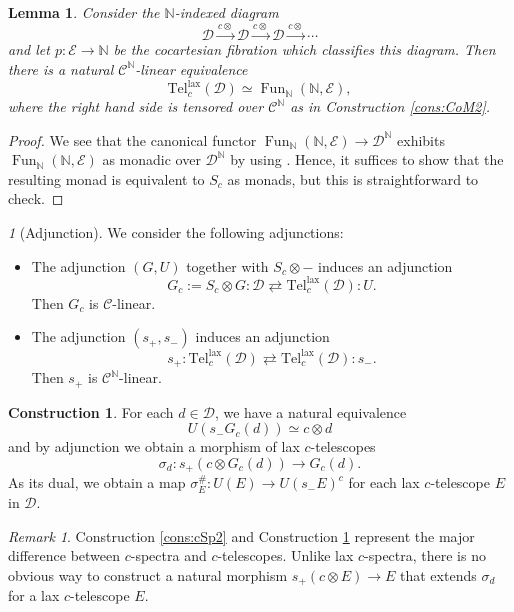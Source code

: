 \documentclass{amsart}
\theoremstyle{plain}
\newtheorem{lemma}[theorem]{Lemma}
\theoremstyle{definition}
\newtheorem{construction}[theorem]{Construction}
\theoremstyle{remark}
\newtheorem{remark}[theorem]{Remark}
\newtheorem{p}[theorem]{}
\numberwithin{equation}{theorem}
\newcommand{\mcal}[1]{\mathcal{#1}}
\newcommand{\mbb}[1]{\mathbb{#1}}
\newcommand{\Tel}{\mathrm{Tel}}
\newcommand{\lax}{\mathrm{lax}}
\newcommand{\Fun}{\operatorname{Fun}}
\begin{document}
\begin{lemma}\label{lem:cTe}
Consider the $\mbb{N}$-indexed diagram
\[
	\mcal{D} \xrightarrow{c\otimes} \mcal{D} \xrightarrow{c\otimes} \mcal{D} \xrightarrow{c\otimes} \cdots 
\]
and let $p\colon\mcal{E}\to\mbb{N}$ be the cocartesian fibration which classifies this diagram.
Then there is a natural $\mcal{C}^\mbb{N}$-linear equivalence
\[
	\Tel^\lax_c(\mcal{D}) \simeq \Fun_{\mbb{N}}(\mbb{N},\mcal{E}),
\]
where the right hand side is tensored over $\mcal{C}^\mbb{N}$ as in Construction \ref{cons:CoM2}.
\end{lemma}
\begin{proof}
We see that the canonical functor $\Fun_{\mbb{N}}(\mbb{N},\mcal{E})\to\mcal{D}^\mbb{N}$ exhibits $\Fun_{\mbb{N}}(\mbb{N},\mcal{E})$ as monadic over $\mcal{D}^\mbb{N}$ by using \cite[4.7.3.5]{HA}.
Hence, it suffices to show that the resulting monad is equivalent to $S_c$ as monads, but this is straightforward to check.
\end{proof}

\begin{p}[Adjunction]\label{p:cTe}
We consider the following adjunctions:
\begin{itemize}[label={---},leftmargin=*]
\item The adjunction $(G,U)$ together with $S_c\otimes-$ induces an adjunction
\[
	G_c:=S_c\otimes G \colon \mcal{D} \rightleftarrows \Tel^\lax_c(\mcal{D}) \colon U.
\]
Then $G_c$ is $\mcal{C}$-linear.
\item The adjunction $(s_+,s_-)$ induces an adjunction 
\[
	s_+ \colon \Tel^\lax_c(\mcal{D}) \rightleftarrows \Tel^\lax_c(\mcal{D}) \colon s_-.
\]
Then $s_+$ is $\mcal{C}^\mbb{N}$-linear.
\end{itemize}
\end{p}

\begin{construction}\label{cons:cTe2}
For each $d\in\mcal{D}$, we have a natural equivalence
\[
	U(s_-G_c(d)) \simeq c\otimes d
\]
and by adjunction we obtain a morphism of lax $c$-telescopes
\[
	\sigma_d\colon s_+(c\otimes G_c(d))\to G_c(d).
\]
As its dual, we obtain a map $\sigma^\#_E\colon U(E)\to U(s_-E)^c$ for each lax $c$-telescope $E$ in $\mcal{D}$.
\end{construction}

\begin{remark}
Construction \ref{cons:cSp2} and Construction \ref{cons:cTe2} represent the major difference between $c$-spectra and $c$-telescopes.
Unlike lax $c$-spectra, there is no obvious way to construct a natural morphism $s_+(c\otimes E)\to E$ that extends $\sigma_d$ for a lax $c$-telescope $E$.
\end{remark}
\end{document}
